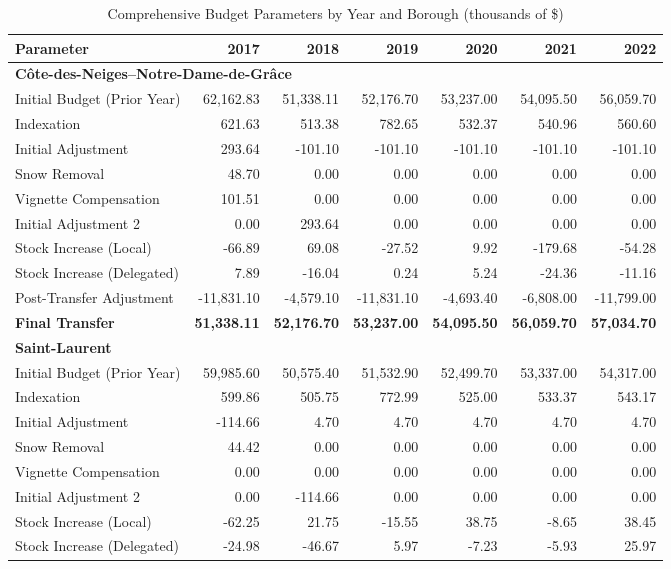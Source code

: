 \documentclass{article}
\begin{document}
\begin{longtable}{lrrrrrr}
\caption{Comprehensive Budget Parameters by Year and Borough (thousands of \$)} \\
\toprule
Parameter & 2017 & 2018 & 2019 & 2020 & 2021 & 2022 \\
\midrule
\endhead
\multicolumn{7}{l}{\textbf{Côte-des-Neiges–Notre-Dame-de-Grâce}} \\
\midrule
Initial Budget (Prior Year) & 62,162.83 & 51,338.11 & 52,176.70 & 53,237.00 & 54,095.50 & 56,059.70 \\
Indexation & 621.63 & 513.38 & 782.65 & 532.37 & 540.96 & 560.60 \\
Initial Adjustment & 293.64 & -101.10 & -101.10 & -101.10 & -101.10 & -101.10 \\
Snow Removal & 48.70 & 0.00 & 0.00 & 0.00 & 0.00 & 0.00 \\
Vignette Compensation & 101.51 & 0.00 & 0.00 & 0.00 & 0.00 & 0.00 \\
Initial Adjustment 2 & 0.00 & 293.64 & 0.00 & 0.00 & 0.00 & 0.00 \\
Stock Increase (Local) & -66.89 & 69.08 & -27.52 & 9.92 & -179.68 & -54.28 \\
Stock Increase (Delegated) & 7.89 & -16.04 & 0.24 & 5.24 & -24.36 & -11.16 \\
Post-Transfer Adjustment & -11,831.10 & -4,579.10 & -11,831.10 & -4,693.40 & -6,808.00 & -11,799.00 \\
\textbf{Final Transfer} & \textbf{51,338.11} & \textbf{52,176.70} & \textbf{53,237.00} & \textbf{54,095.50} & \textbf{56,059.70} & \textbf{57,034.70} \\
\midrule
\multicolumn{7}{l}{\textbf{Saint-Laurent}} \\
\midrule
Initial Budget (Prior Year) & 59,985.60 & 50,575.40 & 51,532.90 & 52,499.70 & 53,337.00 & 54,317.00 \\
Indexation & 599.86 & 505.75 & 772.99 & 525.00 & 533.37 & 543.17 \\
Initial Adjustment & -114.66 & 4.70 & 4.70 & 4.70 & 4.70 & 4.70 \\
Snow Removal & 44.42 & 0.00 & 0.00 & 0.00 & 0.00 & 0.00 \\
Vignette Compensation & 0.00 & 0.00 & 0.00 & 0.00 & 0.00 & 0.00 \\
Initial Adjustment 2 & 0.00 & -114.66 & 0.00 & 0.00 & 0.00 & 0.00 \\
Stock Increase (Local) & -62.25 & 21.75 & -15.55 & 38.75 & -8.65 & 38.45 \\
Stock Increase (Delegated) & -24.98 & -46.67 & 5.97 & -7.23 & -5.93 & 25.97 \\

\end{longtable}
\end{document}
